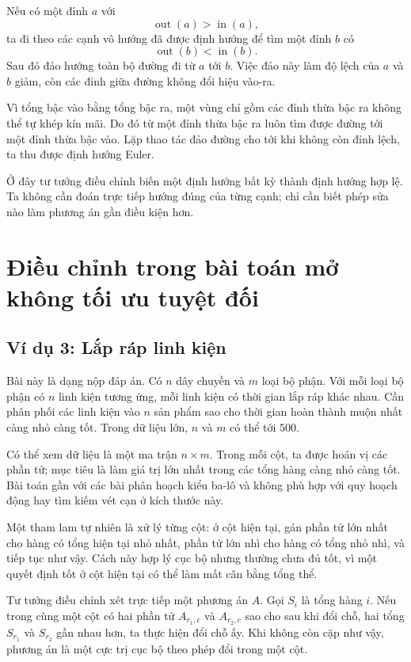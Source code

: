 \documentclass[11pt]{article}
\begin{document}
Nếu có một đỉnh \(a\) với
\[
  \operatorname{out}(a)>\operatorname{in}(a),
\]
ta đi theo các cạnh vô hướng đã được định hướng để tìm một đỉnh \(b\) có
\[
  \operatorname{out}(b)<\operatorname{in}(b).
\]
Sau đó đảo hướng toàn bộ đường đi từ \(a\) tới \(b\). Việc đảo này làm độ lệch
của \(a\) và \(b\) giảm, còn các đỉnh giữa đường không đổi hiệu vào-ra.

Vì tổng bậc vào bằng tổng bậc ra, một vùng chỉ gồm các đỉnh thừa bậc ra không
thể tự khép kín mãi. Do đó từ một đỉnh thừa bậc ra luôn tìm được đường tới một
đỉnh thừa bậc vào. Lặp thao tác đảo đường cho tới khi không còn đỉnh lệch, ta
thu được định hướng Euler.

Ở đây tư tưởng điều chỉnh biến một định hướng bất kỳ thành định hướng hợp lệ.
Ta không cần đoán trực tiếp hướng đúng của từng cạnh; chỉ cần biết phép sửa nào
làm phương án gần điều kiện hơn.

\section{Điều chỉnh trong bài toán mở không tối ưu tuyệt đối}

\subsection{Ví dụ 3: Lắp ráp linh kiện}

Bài này là dạng nộp đáp án. Có \(n\) dây chuyền và \(m\) loại bộ phận. Với mỗi
loại bộ phận có \(n\) linh kiện tương ứng, mỗi linh kiện có thời gian lắp ráp
khác nhau. Cần phân phối các linh kiện vào \(n\) sản phẩm sao cho thời gian
hoàn thành muộn nhất càng nhỏ càng tốt. Trong dữ liệu lớn, \(n\) và \(m\) có
thể tới \(500\).

Có thể xem dữ liệu là một ma trận \(n\times m\). Trong mỗi cột, ta được hoán
vị các phần tử; mục tiêu là làm giá trị lớn nhất trong các tổng hàng càng nhỏ
càng tốt. Bài toán gần với các bài phân hoạch kiểu ba-lô và không phù hợp với
quy hoạch động hay tìm kiếm vét cạn ở kích thước này.

Một tham lam tự nhiên là xử lý từng cột: ở cột hiện tại, gán phần tử lớn nhất
cho hàng có tổng hiện tại nhỏ nhất, phần tử lớn nhì cho hàng có tổng nhỏ nhì,
và tiếp tục như vậy. Cách này hợp lý cục bộ nhưng thường chưa đủ tốt, vì một
quyết định tốt ở cột hiện tại có thể làm mất cân bằng tổng thể.

Tư tưởng điều chỉnh xét trực tiếp một phương án \(A\). Gọi \(S_i\) là tổng
hàng \(i\). Nếu trong cùng một cột có hai phần tử \(A_{r_1,c}\) và \(A_{r_2,c}\)
sao cho sau khi đổi chỗ, hai tổng \(S_{r_1}\) và \(S_{r_2}\) gần nhau hơn, ta
thực hiện đổi chỗ ấy. Khi không còn cặp như vậy, phương án là một cực trị cục
bộ theo phép đổi trong một cột.
\end{document}
